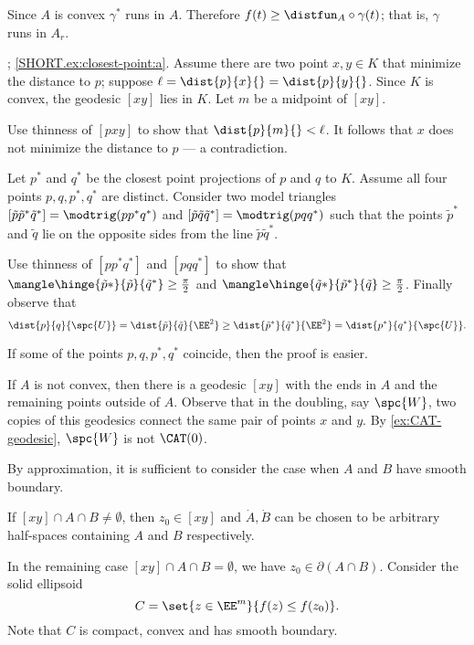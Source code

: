 Since $A$ is convex $\gamma^*$ runs in $A$.
Therefore $f(t)\ge \distfun_A\circ\gamma(t)$;
that is, $\gamma$  runs in $A_r$.

; \ref{SHORT.ex:closest-point:a}.
Assume there are two point $x,y\in K$ that minimize the distance to $p$;
suppose $\ell=\dist{p}{x}{}=\dist{p}{y}{}$.
Since $K$ is convex, the geodesic $[xy]$ lies in $K$.
Let $m$ be a midpoint of $[xy]$.

Use thinness of $[pxy]$ to show that $\dist{p}{m}{}<\ell$.
It follows that $x$ does not minimize the distance to $p$ --- a contradiction.

Let $p^*$ and $q^*$ be the closest point projections of $p$ and $q$ to $K$.
Assume all four points $p,q,p^*,q^*$ are distinct.
Consider two model triangles $[\tilde p\tilde p^*\tilde q^*]=\modtrig(pp^*q^*)$ and $[\tilde p\tilde q\tilde q^*]=\modtrig(pqq^*)$ 
such that the points $\tilde p^*$ and $\tilde q$ lie on the opposite sides from the line $\tilde p\tilde q^*$.

Use thinness of $[pp^*q^*]$ and $[pqq^*]$ to show that $\mangle\hinge{\tilde p*}{\tilde p}{\tilde q^*}\ge \tfrac\pi2$ and $\mangle\hinge{\tilde q*}{\tilde p^*}{\tilde q}\ge \tfrac\pi2$.
Finally observe that 
\[\dist{p}{q}{\spc{U}}=\dist{\tilde p}{\tilde q}{\EE^2}\ge \dist{\tilde p^*}{\tilde q^*}{\EE^2}=\dist{p^*}{q^*}{\spc{U}}.\]

If some of the points $p,q,p^*,q^*$ coincide, then the proof is easier.


If $A$ is not convex, then there is a geodesic $[xy]$ with the ends in $A$ and the remaining points outside of $A$.
Observe that in the doubling, say $\spc{W}$, two copies of this geodesics connect the same pair of points $x$ and $y$.
By \ref{ex:CAT-geodesic}, $\spc{W}$ is not $\CAT(0)$.

By approximation, it is sufficient to consider the case when 
$A$ and $B$ have smooth boundary. 

If $[xy]\cap A\cap B\ne \emptyset$, then $z_0\in [xy]$ and $\dot A, \dot B$ can be chosen to be arbitrary half-spaces containing $A$ and $B$ respectively.  

In the remaining case $[xy]\cap A\cap B=\emptyset$, 
we have $z_0\in\partial (A\cap B)$.  
Consider the solid ellipsoid
\[C=\set{z\in\EE^m}{f(z)\le f(z_0)}.\] 
Note that $C$ is compact, convex and has  smooth boundary. 

